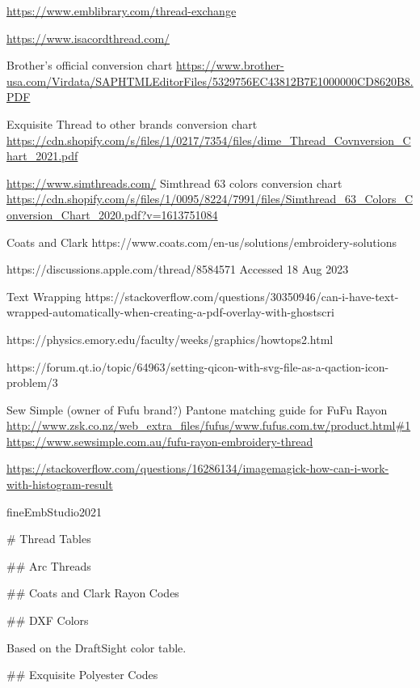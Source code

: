 \url{https://www.emblibrary.com/thread-exchange}

\url{https://www.isacordthread.com/}

Brother's official conversion chart
\url{https://www.brother-usa.com/Virdata/SAPHTMLEditorFiles/5329756EC43812B7E1000000CD8620B8.PDF}

Exquisite Thread to other brands conversion chart
\url{https://cdn.shopify.com/s/files/1/0217/7354/files/dime_Thread_Covnversion_Chart_2021.pdf}

\url{https://www.simthreads.com/}
Simthread 63 colors conversion chart
\url{https://cdn.shopify.com/s/files/1/0095/8224/7991/files/Simthread_63_Colors_Conversion_Chart_2020.pdf?v=1613751084}

Coats and Clark https://www.coats.com/en-us/solutions/embroidery-solutions

https://discussions.apple.com/thread/8584571 Accessed 18 Aug 2023

Text Wrapping
https://stackoverflow.com/questions/30350946/can-i-have-text-wrapped-automatically-when-creating-a-pdf-overlay-with-ghostscri

https://physics.emory.edu/faculty/weeks/graphics/howtops2.html

https://forum.qt.io/topic/64963/setting-qicon-with-svg-file-as-a-qaction-icon-problem/3

Sew Simple (owner of Fufu brand?) Pantone matching guide for FuFu Rayon
\url{http://www.zsk.co.nz/web_extra_files/fufus/www.fufus.com.tw/product.html#1}
\url{https://www.sewsimple.com.au/fufu-rayon-embroidery-thread}

\url{https://stackoverflow.com/questions/16286134/imagemagick-how-can-i-work-with-histogram-result}

fineEmbStudio2021

# Thread Tables

## Arc Threads

%

%

## Coats and Clark Rayon Codes

%

## DXF Colors

Based on the DraftSight color table.

%

## Exquisite Polyester Codes

%

